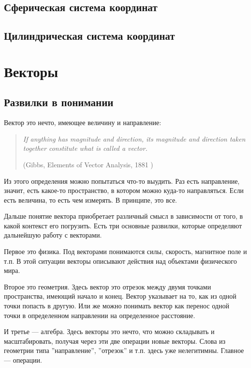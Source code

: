 \documentclass[a4paper,12pt]{article}
\newcounter{th-counter}
\begin{document}
\subsection*{Сферическая система координат}

\subsection*{Цилиндрическая система координат}


\section*{Векторы}
\subsection*{Развилки в понимании}
Вектор это нечто, имеющее величину и направление:
\begin{quote}
\itshape
If anything has magnitude and direction, its magnitude and direction taken together constitute what is called a vector. 

(Gibbs, Elements of Vector Analysis, 1881 \cite{GibbsVectorAnalysis})
\end{quote}

Из этого определения можно попытаться что-то выудить. Раз есть направление, значит, есть какое-то пространство, в котором можно куда-то направляться. Если есть величина, то есть чем измерять. В принципе, это все.

Дальше понятие вектора приобретает различный смысл в зависимости от того, в какой контекст его погрузить. Есть три основные развилки, которые определяют дальнейшую работу с векторами.

Первое это физика. Под векторами понимаются силы, скорость, магнитное поле и т.п. В этой ситуации векторы описывают действия над объектами физического мира.

Второе это геометрия. Здесь вектор это отрезок между двумя точками пространства, имеющий начало и конец. Вектор указывает на то, как из одной точки попасть в другую. Или же можно понимать вектор как перенос одной точки в определенном направлении на определенное расстояние.

И третье --- алгебра. Здесь векторы это нечто, что можно складывать и масштабировать, получая через эти две операции новые векторы. Слова из геометрии типа ''направление'', ''отрезок'' и т.п. здесь уже нелегитимны. Главное --- операции.
\end{document}
